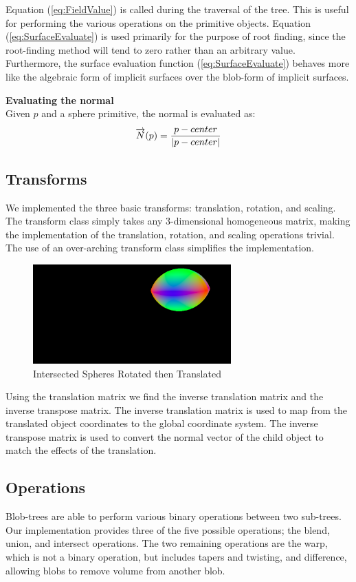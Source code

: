 \documentclass[conference]{acmsiggraph}
\begin{document}
Equation  (\ref{eq:FieldValue}) is called during the traversal of the tree. This
is useful for performing the various operations on the primitive objects.
Equation (\ref{eq:SurfaceEvaluate}) is used primarily for the purpose of root
finding, since the root-finding method will tend to zero rather than an
arbitrary value. Furthermore, the surface evaluation function
(\ref{eq:SurfaceEvaluate}) behaves more like the algebraic form of implicit
surfaces over the blob-form of implicit surfaces.


\textbf{Evaluating the normal}\\
Given $p$ and a sphere primitive, the normal is evaluated as:
$$ \overrightarrow{N}(p) = {p - center \over \lvert p - center \rvert}$$

\subsection{Transforms}
We implemented the three basic transforms: translation, rotation, and scaling.
The transform class simply takes any 3-dimensional homogeneous matrix, making
the implementation of the translation, rotation, and scaling operations
trivial. The use of an over-arching transform class simplifies the
implementation.

\begin{figure}[htb]
	\centering
	\includegraphics[height=1.5in]{images/intersect_rotate.png}
	\caption{Intersected Spheres Rotated then Translated}
\end{figure}

Using the translation matrix we find the inverse translation matrix and the
inverse transpose matrix. The inverse translation matrix is used to map from
the translated object coordinates to the global coordinate system. The inverse
transpose matrix is used to convert the normal vector of the child object to
match the effects of the translation. 


\subsection{Operations}
Blob-trees are able to perform various binary operations between two
sub-trees. Our implementation provides three of the five possible operations;
the blend, union, and intersect operations. The two remaining operations are
the warp, which is not a binary operation, but includes tapers and twisting,
and difference, allowing blobs to remove volume from another blob.
\end{document}
